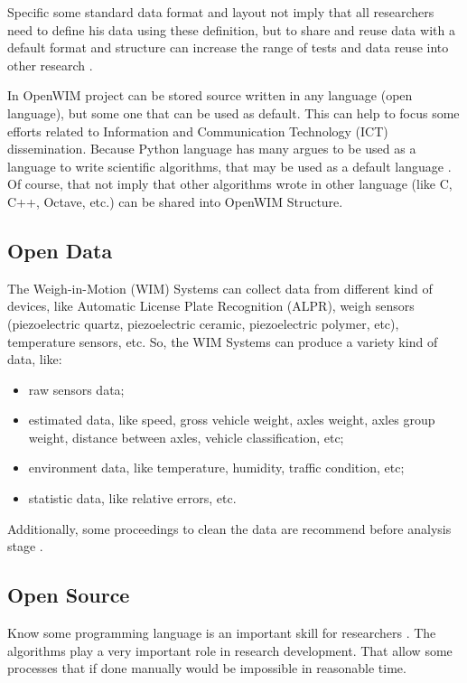 \documentclass[a4paper]{article}
\begin{document}
{Specific some standard data format and layout not imply that all researchers need to define his data using these definition, but to share and reuse data with a default format and structure can increase the range of tests and data reuse into other research \cite{assante2015science, toby2015practices}.

In OpenWIM project can be stored source written in any language (open language), but some one that can be used as default. This can help to focus some efforts related to Information and Communication Technology (ICT) dissemination. Because Python language has many argues to be used as a language to write scientific algorithms, that may be used as a default language \cite{ayer2014scientists}. Of course, that not imply that other algorithms wrote in other language (like C, C++, Octave, etc.) can be shared into OpenWIM Structure.


\subsection{Open Data}\label{open-Data}

The Weigh-in-Motion (WIM) Systems can collect data from different kind of devices, like Automatic License Plate Recognition (ALPR), weigh sensors (piezoelectric quartz, piezoelectric ceramic, piezoelectric polymer, etc), temperature sensors, etc. So, the WIM Systems can produce a variety kind of data, like:

\begin{itemize}
\item raw sensors data;
\item estimated data, like speed, gross vehicle weight, axles weight, axles group weight, distance between axles, vehicle classification, etc;
\item environment data, like temperature, humidity, traffic condition, etc;
\item statistic data, like relative errors, etc.
\end{itemize}

Additionally, some proceedings to clean the data are recommend before analysis stage \cite{elkins2008development, enright2011cleaning}.

\subsection{Open Source}\label{open-source}

Know some programming language is an important skill for researchers \cite{ayer2014scientists}. The algorithms play a very important role in research development. That allow some processes that if done manually would be impossible in reasonable time.

}
\end{document}
